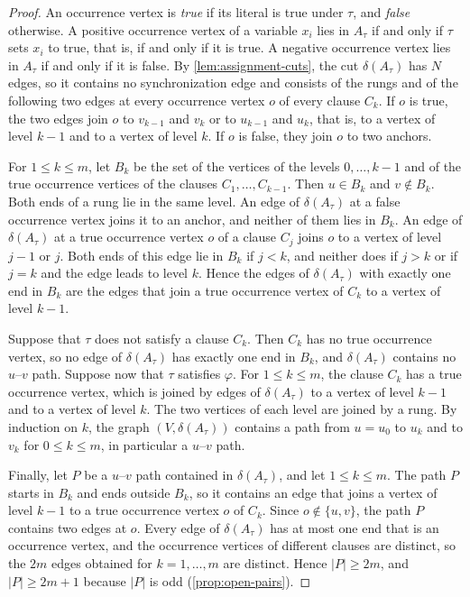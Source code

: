 \begin{proof}
An occurrence vertex is \emph{true} if its literal is true under $\tau$, and \emph{false} otherwise.
A positive occurrence vertex of a variable $x_i$ lies in $A_\tau$ if and only if $\tau$ sets $x_i$ to true, that is, if and only if it is true.
A negative occurrence vertex lies in $A_\tau$ if and only if it is false.
By \cref{lem:assignment-cuts}, the cut $\delta(A_\tau)$ has $N$ edges, so it contains no synchronization edge and consists of the rungs and of the following two edges at every occurrence vertex $o$ of every clause $C_k$.
If $o$ is true, the two edges join $o$ to $v_{k-1}$ and $v_k$ or to $u_{k-1}$ and $u_k$, that is, to a vertex of level $k - 1$ and to a vertex of level $k$.
If $o$ is false, they join $o$ to two anchors.

For $1 \leq k \leq m$, let $B_k$ be the set of the vertices of the levels $0, \dots, k - 1$ and of the true occurrence vertices of the clauses $C_1, \dots, C_{k-1}$.
Then $u \in B_k$ and $v \notin B_k$.
Both ends of a rung lie in the same level.
An edge of $\delta(A_\tau)$ at a false occurrence vertex joins it to an anchor, and neither of them lies in $B_k$.
An edge of $\delta(A_\tau)$ at a true occurrence vertex $o$ of a clause $C_j$ joins $o$ to a vertex of level $j - 1$ or $j$.
Both ends of this edge lie in $B_k$ if $j < k$, and neither does if $j > k$ or if $j = k$ and the edge leads to level $k$.
Hence the edges of $\delta(A_\tau)$ with exactly one end in $B_k$ are the edges that join a true occurrence vertex of $C_k$ to a vertex of level $k - 1$.

Suppose that $\tau$ does not satisfy a clause $C_k$.
Then $C_k$ has no true occurrence vertex, so no edge of $\delta(A_\tau)$ has exactly one end in $B_k$, and $\delta(A_\tau)$ contains no $u$--$v$ path.
Suppose now that $\tau$ satisfies $\varphi$.
For $1 \leq k \leq m$, the clause $C_k$ has a true occurrence vertex, which is joined by edges of $\delta(A_\tau)$ to a vertex of level $k - 1$ and to a vertex of level $k$.
The two vertices of each level are joined by a rung.
By induction on $k$, the graph $(V, \delta(A_\tau))$ contains a path from $u = u_0$ to $u_k$ and to $v_k$ for $0 \leq k \leq m$, in particular a $u$--$v$ path.

Finally, let $P$ be a $u$--$v$ path contained in $\delta(A_\tau)$, and let $1 \leq k \leq m$.
The path $P$ starts in $B_k$ and ends outside $B_k$, so it contains an edge that joins a vertex of level $k - 1$ to a true occurrence vertex $o$ of $C_k$.
Since $o \notin \{u, v\}$, the path $P$ contains two edges at $o$.
Every edge of $\delta(A_\tau)$ has at most one end that is an occurrence vertex, and the occurrence vertices of different clauses are distinct, so the $2m$ edges obtained for $k = 1, \dots, m$ are distinct.
Hence $|P| \geq 2m$, and $|P| \geq 2m + 1$ because $|P|$ is odd (\cref{prop:open-pairs}).
\end{proof}

